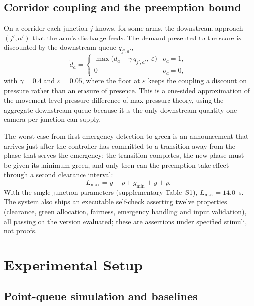 \documentclass[journal]{IEEEtran}
\begin{document}
\subsection{Corridor coupling and the preemption bound}

On a corridor each junction $j$ knows, for some arms, the downstream approach $(j', a')$ that the arm's
discharge feeds. The demand presented to the score is discounted by the downstream queue $q_{j',a'}$,
\begin{equation}
\tilde{d}_a =
\begin{cases}
\max\big(d_a - \gamma\, q_{j',a'},\ \varepsilon\big) & o_a = 1,\\
0 & o_a = 0,
\end{cases}
\label{eq:coupling}
\end{equation}
with $\gamma = 0.4$ and $\varepsilon = 0.05$, where the floor at $\varepsilon$ keeps the coupling a discount on pressure rather than an erasure of presence.
This is a one-sided approximation of the movement-level pressure difference of max-pressure theory, using
the aggregate downstream queue because it is the only downstream quantity one camera per junction can supply.

The worst case from first emergency detection to green is an announcement that arrives just after the
controller has committed to a transition away from the phase that serves the emergency: the transition
completes, the new phase must be given its minimum green, and only then can the preemption take effect
through a second clearance interval:
\begin{equation}
L_{\max} = y + \rho + g_{\min} + y + \rho .
\label{eq:bound}
\end{equation}
With the single-junction parameters (supplementary Table~S1), $L_{\max} = 14.0$~s. The system also ships an executable self-check asserting twelve properties (clearance, green allocation,
fairness, emergency handling and input validation), all passing on the version evaluated; these are
assertions under specified stimuli, not proofs.

\section{Experimental Setup}
\label{sec:setup}

\subsection{Point-queue simulation and baselines}
\end{document}
